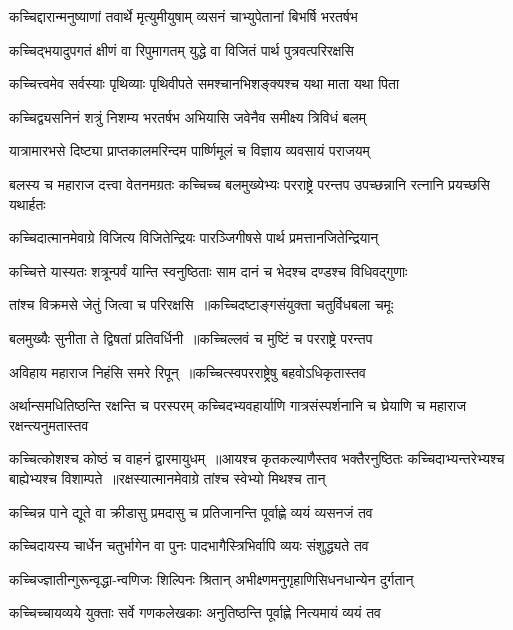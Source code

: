 \twolineshloka
{कच्चिद्दारान्मनुष्याणां तवार्थे मृत्युमीयुषाम्}
{व्यसनं चाभ्युपेतानां बिभर्षि भरतर्षभ}


\twolineshloka
{कच्चिद्भयादुपगतं क्षीणं वा रिपुमागतम्}
{युद्धे वा विजितं पार्थ पुत्रवत्परिरक्षसि}


\twolineshloka
{कच्चित्त्वमेव सर्वस्याः पृथिव्याः पृथिवीपते}
{समश्चानभिशङ्क्यश्च यथा माता यथा पिता}


\twolineshloka
{कच्चिद्व्यसनिनं शत्रुं निशम्य भरतर्षभ}
{अभियासि जवेनैव समीक्ष्य त्रिविधं बलम्}


\twolineshloka
{यात्रामारभसे दिष्ट्या प्राप्तकालमरिन्दम}
{पार्ष्णिमूलं च विज्ञाय व्यवसायं पराजयम्}


\threelineshloka
{बलस्य च महाराज दत्त्वा वेतनमग्रतः}
{कच्चिच्च बलमुख्येभ्यः परराष्ट्रे परन्तप}
{उपच्छन्नानि रत्नानि प्रयच्छसि यथार्हतः}


\twolineshloka
{कच्चिदात्मानमेवाग्रे विजित्य विजितेन्द्रियः}
{पारञ्जिगीषसे पार्थ प्रमत्तानजितेन्द्रियान्}


\twolineshloka
{कच्चित्ते यास्यतः शत्रून्पर्वं यान्ति स्वनुष्ठिताः}
{साम दानं च भेदश्च दण्डश्च विधिवद्गुणाः}


\twolineshloka
{तांश्च विक्रमसे जेतुं जित्वा च परिरक्षसि ॥कच्चिदष्टाङ्गसंयुक्ता चतुर्विधबला चमूः}
{}


\twolineshloka
{बलमुख्यैः सुनीता ते द्विषतां प्रतिवर्धिनी ॥कच्चिल्लवं च मुष्टिं च परराष्ट्रे परन्तप}
{}


\twolineshloka
{अविहाय महाराज निहंसि समरे रिपून् ॥कच्चित्स्वपरराष्ट्रेषु बहवोऽधिकृतास्तव}
{}


अर्थान्समधितिष्ठन्ति रक्षन्ति च परस्परम्
\threelineshloka
{कच्चिदभ्यवहार्याणि गात्रसंस्पर्शनानि च}
{घ्रेयाणि च महाराज रक्षन्त्यनुमतास्तव}
{}


कच्चित्कोशश्च कोष्ठं च वाहनं द्वारमायुधम् ॥आयश्च कृतकल्याणैस्तव भक्तैरनुष्ठितः
\twolineshloka
{कच्चिदाभ्यन्तरेभ्यश्च बाह्येभ्यश्च विशाम्पते ॥रक्षस्यात्मानमेवाग्रे तांश्च स्वेभ्यो मिथश्च तान्}
{}


\twolineshloka
{कच्चिन्न पाने द्यूते वा क्रीडासु प्रमदासु च}
{प्रतिजानन्ति पूर्वाह्णे व्ययं व्यसनजं तव}


\twolineshloka
{कच्चिदायस्य चार्धेन चतुर्भागेन वा पुनः}
{पादभागैस्त्रिभिर्वापि व्ययः संशुद्ध्यते तव}


\twolineshloka
{कच्चिज्ज्ञातीन्गुरून्वृद्धा-न्वणिजः शिल्पिनः श्रितान्}
{अभीक्ष्णमनुगृहाणिसिधनधान्येन दुर्गतान्}


\twolineshloka
{कच्चिच्चायव्यये युक्ताः सर्वे गणकलेखकाः}
{अनुतिष्ठन्ति पूर्वाह्णे नित्यमायं व्ययं तव}


